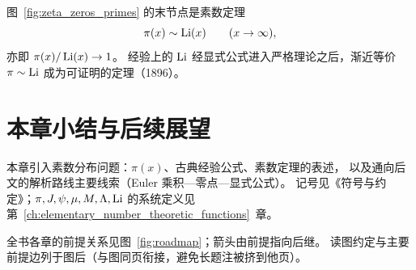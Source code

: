 图~\ref{fig:zeta_zeros_primes} 的末节点是素数定理
\[
  \pi(x)\sim\operatorname{Li}(x)
  \qquad (x\to\infty),
\]
亦即 $\pi(x)/\operatorname{Li}(x)\to 1$。
经验上的 $\operatorname{Li}$ 经显式公式进入严格理论之后，渐近等价 $\pi\sim\operatorname{Li}$ 成为可证明的定理（1896）。

\begin{center}
\end{center}

\section*{本章小结与后续展望}

本章引入素数分布问题：$\pi(x)$、古典经验公式、素数定理的表述，
以及通向后文的解析路线主要线索（Euler 乘积—零点—显式公式）。
记号见《符号与约定》；$\pi,J,\psi,\mu,M,\Lambda,\operatorname{Li}$ 的系统定义见第~\ref{ch:elementary_number_theoretic_functions}~章。

全书各章的前提关系见图~\ref{fig:roadmap}；箭头由前提指向后继。
读图约定与主要前提边列于图后（与图同页衔接，避免长题注被挤到他页）。

